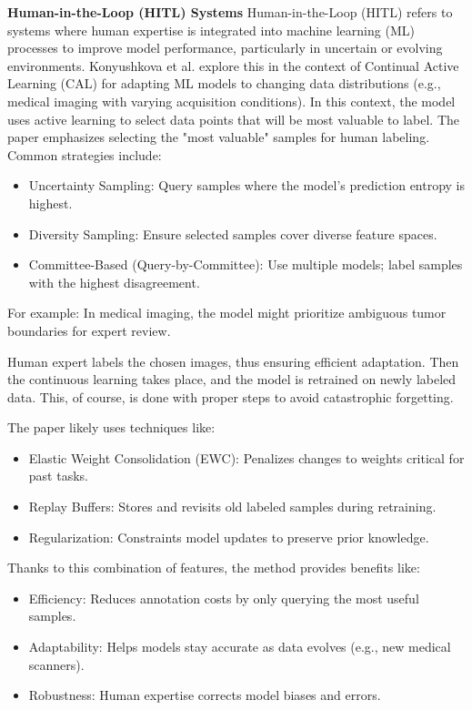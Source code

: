 \documentclass{IEEEcsmag}
\begin{document}
    \textbf{Human-in-the-Loop (HITL) Systems}
        Human-in-the-Loop (HITL) refers to systems where human expertise is integrated into machine learning (ML) processes to improve model performance, particularly in uncertain or evolving environments.
        Konyushkova et al.\cite{cite-10} explore this in the context of Continual Active Learning (CAL) for adapting ML models to changing data distributions (e.g., medical imaging with varying acquisition conditions).
        In this context, the model uses active learning to select data points that will be most valuable to label.
        The paper emphasizes selecting the "most valuable" samples for human labeling. Common strategies include:
            \begin{itemize}
                \item Uncertainty Sampling: Query samples where the model’s prediction entropy is highest.
                \item Diversity Sampling: Ensure selected samples cover diverse feature spaces.
                \item Committee-Based (Query-by-Committee): Use multiple models; label samples with the highest disagreement.
            \end{itemize}
        For example: In medical imaging, the model might prioritize ambiguous tumor boundaries for expert review.
 
        Human expert labels the chosen images, thus ensuring efficient adaptation.
        Then the continuous learning takes place, and the model is retrained on newly labeled data.
        This, of course, is done with proper steps to avoid catastrophic forgetting.
               
        The paper likely uses techniques like:
            \begin{itemize}
                \item Elastic Weight Consolidation (EWC): Penalizes changes to weights critical for past tasks.
                \item Replay Buffers: Stores and revisits old labeled samples during retraining.
                \item Regularization: Constraints model updates to preserve prior knowledge.
            \end{itemize}
        Thanks to this combination of features, the method provides benefits like:
        \begin{itemize}
            \item Efficiency: Reduces annotation costs by only querying the most useful samples.
            \item Adaptability: Helps models stay accurate as data evolves (e.g., new medical scanners).
            \item Robustness: Human expertise corrects model biases and errors.
        \end{itemize}
        
\end{document}
